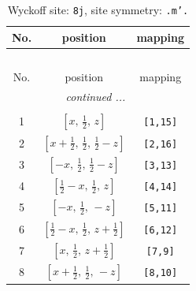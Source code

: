 \documentclass[fleqn,8pt]{jsarticle}
\begin{document}
\begin{longtable}{ccc}
\caption{Wyckoff site: {\tt 8j}, site symmetry: {\tt .m'.}}
 \\
 \hline \hline
No. & position & mapping \\ \hline \endfirsthead

\multicolumn{2}{l}{\tablename\ \thetable{}} \\
 \hline \hline
No. & position & mapping \\ \hline \endhead

 \hline \hline
\multicolumn{2}{r}{\footnotesize\it continued ...} \\ \endfoot

 \hline \hline
\multicolumn{2}{r}{} \\ \endlastfoot

1 & $\left[ x,\, \frac{1}{2},\, z \right]$ & {\tt [1,15]} \\ \hline
2 & $\left[ x + \frac{1}{2},\, \frac{1}{2},\, \frac{1}{2} - z \right]$ & {\tt [2,16]} \\ \hline
3 & $\left[ - x,\, \frac{1}{2},\, \frac{1}{2} - z \right]$ & {\tt [3,13]} \\ \hline
4 & $\left[ \frac{1}{2} - x,\, \frac{1}{2},\, z \right]$ & {\tt [4,14]} \\ \hline
5 & $\left[ - x,\, \frac{1}{2},\, - z \right]$ & {\tt [5,11]} \\ \hline
6 & $\left[ \frac{1}{2} - x,\, \frac{1}{2},\, z + \frac{1}{2} \right]$ & {\tt [6,12]} \\ \hline
7 & $\left[ x,\, \frac{1}{2},\, z + \frac{1}{2} \right]$ & {\tt [7,9]} \\ \hline
8 & $\left[ x + \frac{1}{2},\, \frac{1}{2},\, - z \right]$ & {\tt [8,10]} \\
\end{longtable}
\renewcommand{\arraystretch}{1.2}
\end{document}
